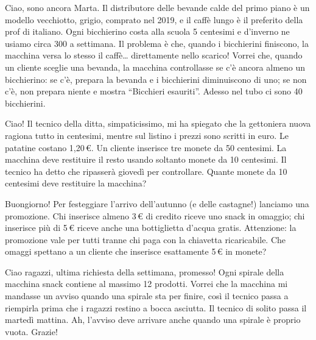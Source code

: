 \begin{esercizio}
Ciao, sono ancora Marta. Il distributore delle bevande calde del primo piano è un modello vecchiotto, grigio, comprato nel 2019, e il caffè lungo è il preferito della prof di italiano. Ogni bicchierino costa alla scuola 5 centesimi e d'inverno ne usiamo circa 300 a settimana. Il problema è che, quando i bicchierini finiscono, la macchina versa lo stesso il caffè\dots{} direttamente nello scarico! Vorrei che, quando un cliente sceglie una bevanda, la macchina controllasse se c'è ancora almeno un bicchierino: se c'è, prepara la bevanda e i bicchierini diminuiscono di uno; se non c'è, non prepara niente e mostra ``Bicchieri esauriti''. Adesso nel tubo ci sono 40 bicchierini.
\end{esercizio}

\begin{esercizio}
Ciao! Il tecnico della ditta, simpaticissimo, mi ha spiegato che la gettoniera nuova ragiona tutto in centesimi, mentre sul listino i prezzi sono scritti in euro. Le patatine costano 1,20\,\euro. Un cliente inserisce tre monete da 50 centesimi. La macchina deve restituire il resto usando soltanto monete da 10 centesimi. Il tecnico ha detto che ripasserà giovedì per controllare. Quante monete da 10 centesimi deve restituire la macchina?
\end{esercizio}

\begin{esercizio}
Buongiorno! Per festeggiare l'arrivo dell'autunno (e delle castagne!) lanciamo una promozione. Chi inserisce almeno 3\,\euro{} di credito riceve uno snack in omaggio; chi inserisce più di 5\,\euro{} riceve anche una bottiglietta d'acqua gratis. Attenzione: la promozione vale per tutti tranne chi paga con la chiavetta ricaricabile. Che omaggi spettano a un cliente che inserisce esattamente 5\,\euro{} in monete?
\end{esercizio}

\begin{esercizio}
Ciao ragazzi, ultima richiesta della settimana, promesso! Ogni spirale della macchina snack contiene al massimo 12 prodotti. Vorrei che la macchina mi mandasse un avviso quando una spirale sta per finire, così il tecnico passa a riempirla prima che i ragazzi restino a bocca asciutta. Il tecnico di solito passa il martedì mattina. Ah, l'avviso deve arrivare anche quando una spirale è proprio vuota. Grazie!
\end{esercizio}

